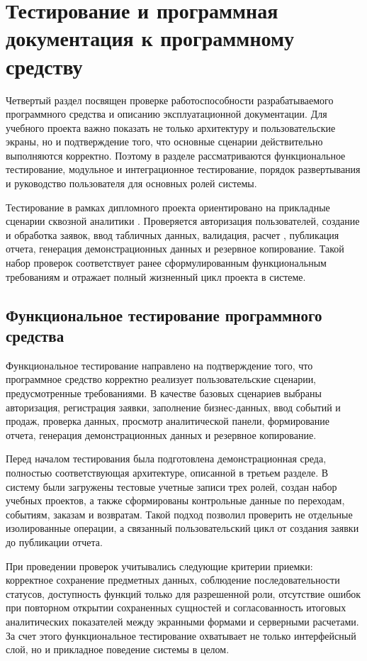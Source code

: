 \section{Тестирование и программная документация к программному средству}

Четвертый раздел посвящен проверке работоспособности разрабатываемого программного средства и описанию эксплуатационной документации. Для учебного проекта важно показать не только архитектуру и пользовательские экраны, но и подтверждение того, что основные сценарии действительно выполняются корректно. Поэтому в разделе рассматриваются функциональное тестирование, модульное и интеграционное тестирование, порядок развертывания и руководство пользователя для основных ролей системы.

Тестирование в рамках дипломного проекта ориентировано на прикладные сценарии сквозной аналитики . Проверяется авторизация пользователей, создание и обработка заявок, ввод табличных данных, валидация, расчет , публикация отчета, генерация демонстрационных данных и резервное копирование. Такой набор проверок соответствует ранее сформулированным функциональным требованиям и отражает полный жизненный цикл проекта в системе.

\subsection{Функциональное тестирование программного средства}

Функциональное тестирование направлено на подтверждение того, что программное средство корректно реализует пользовательские сценарии, предусмотренные требованиями. В качестве базовых сценариев выбраны авторизация, регистрация заявки, заполнение бизнес-данных, ввод событий и продаж, проверка данных, просмотр аналитической панели, формирование отчета, генерация демонстрационных данных и резервное копирование.

Перед началом тестирования была подготовлена демонстрационная среда, полностью соответствующая архитектуре, описанной в третьем разделе. В систему были загружены тестовые учетные записи трех ролей, создан набор учебных проектов, а также сформированы контрольные данные по переходам, событиям, заказам и возвратам. Такой подход позволил проверить не отдельные изолированные операции, а связанный пользовательский цикл от создания заявки до публикации отчета.

При проведении проверок учитывались следующие критерии приемки: корректное сохранение предметных данных, соблюдение последовательности статусов, доступность функций только для разрешенной роли, отсутствие ошибок при повторном открытии сохраненных сущностей и согласованность итоговых аналитических показателей между экранными формами и серверными расчетами. За счет этого функциональное тестирование охватывает не только интерфейсный слой, но и прикладное поведение системы в целом.

